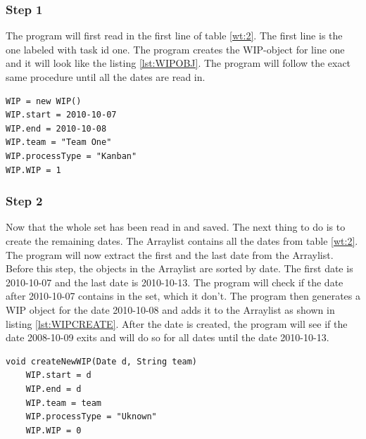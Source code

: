 \documentclass[UKenglish]{ifimaster}  %
\begin{document}
\subsubsection{Step 1}
The program will first read in the first line of table \ref{wt:2}.  The first line is the one labeled with task id one.  The program creates the WIP-object for line one and it will look like the listing \ref{lst:WIPOBJ}.  The program will follow the exact same procedure until all the dates are read in. 

\begin{minipage}{\textwidth} 
\begin{lstlisting}[caption={Creating WIP-object},label={lst:WIPOBJ}]
WIP = new WIP()
WIP.start = 2010-10-07
WIP.end = 2010-10-08
WIP.team = "Team One"
WIP.processType = "Kanban"
WIP.WIP = 1
\end{lstlisting}
  \end{minipage}

 \subsubsection{Step 2}
\label{sub:sub:st}
Now that the whole set has been read in and saved. The next thing to do is to create the remaining dates. The Arraylist contains all the dates from table \ref{wt:2}.  The program will now extract the first and the last date from the Arraylist. Before this step, the objects in the Arraylist are sorted by date. The first date is 2010-10-07 and the last date is 2010-10-13.  The program will check if the date after 2010-10-07 contains in the set, which it don't. The program then generates a WIP object for the date 2010-10-08 and adds it to the Arraylist as shown in listing \ref{lst:WIPCREATE}. After the date is created, the program will see if the date 2008-10-09 exits and will do so for all dates until the date 2010-10-13.

\begin{minipage}{\textwidth} 
\begin{lstlisting}[caption={Creating WIP-object},label={lst:WIPCREATE}]
void createNewWIP(Date d, String team) 
	WIP.start = d
	WIP.end = d
	WIP.team = team
	WIP.processType = "Uknown"
	WIP.WIP = 0
\end{lstlisting}
  \end{minipage}
\end{document}

